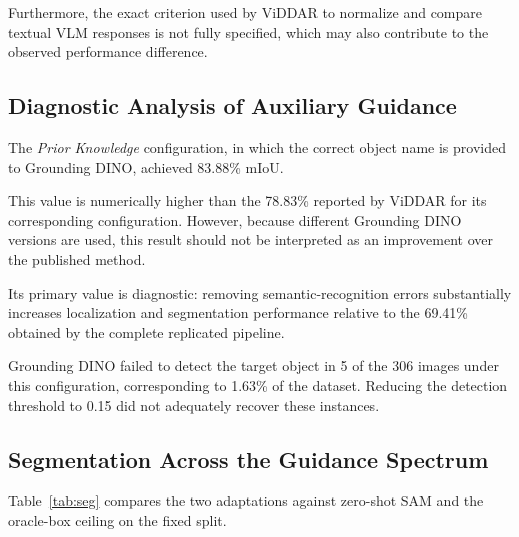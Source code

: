 \documentclass[conference]{IEEEtran}
\begin{document}
Furthermore, the exact criterion used by ViDDAR to normalize and compare textual VLM responses is not fully specified, which may also contribute to the observed performance difference.


\subsection{Diagnostic Analysis of Auxiliary Guidance}

The \textit{Prior Knowledge} configuration, in which the correct object name is provided to Grounding DINO, achieved 83.88\% mIoU.

This value is numerically higher than the 78.83\% reported by ViDDAR for its corresponding configuration. However, because different Grounding DINO versions are used, this result should not be interpreted as an improvement over the published method.

Its primary value is diagnostic: removing semantic-recognition errors substantially increases localization and segmentation performance relative to the 69.41\% obtained by the complete replicated pipeline.

Grounding DINO failed to detect the target object in 5 of the 306 images under this configuration, corresponding to 1.63\% of the dataset. Reducing the detection threshold to 0.15 did not adequately recover these instances.


\subsection{Segmentation Across the Guidance Spectrum}

Table~\ref{tab:seg} compares the two adaptations against zero-shot SAM and the oracle-box ceiling on the fixed split.

\begin{table}[t]
\centering
\caption{Key-object segmentation (IoU and Dice in \%). Validation: 37 images; test: 61 images, with 95\% bootstrap confidence intervals. DINO boxes come from Grounding DINO prompted with the ground-truth object name. Option A validation is the original-resolution evaluation of the chosen run.}
\label{tab:seg}
\end{table}
\end{document}
